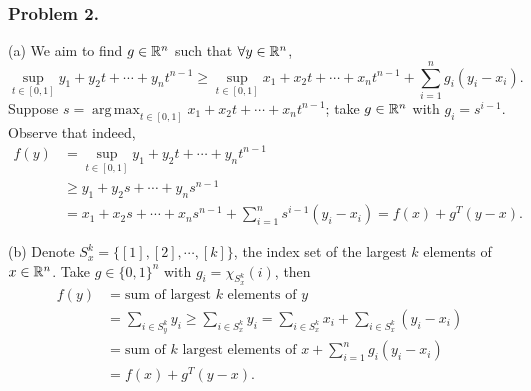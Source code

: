 \documentclass[12pt,a4paper]{article}
\newcommand{\SUM}[2]{\sum\limits_{#1}^{#2}}
\DeclareMathOperator*{\argmax}{arg\,max}
\def\R{\ifmmode\mathbb R\fi}
\newcommand{\nm}[1]{{n-{#1}}}
\begin{document}
\subsubsection*{Problem 2. }
(a) We aim to find $g\in\R^n$ such that $\forall y \in \R^n$,
$$ \sup_{t\in[0, 1]} y_1 + y_2t + \cdots + y_nt^\nm1 \geq \sup_{t\in[0, 1]} x_1 + x_2t + \cdots + x_nt^\nm1 + \SUM{i=1}{n} g_i(y_i - x_i).$$
Suppose $s = \argmax_{t\in[0, 1]} x_1 + x_2t + \cdots + x_nt^\nm1$; take $g\in\R^n$ with $g_i = s^{i-1}$. Observe that indeed,
\begin{align*}
  f(y) & = \sup_{t\in[0, 1]} y_1 + y_2t + \cdots + y_nt^\nm1 \\
       & \geq y_1 + y_2s + \cdots + y_ns^\nm1 \\
       & = x_1 + x_2s + \cdots + x_ns^\nm1 + \SUM{i=1}n s^{i-1}(y_i-x_i) = f(x) + g^T (y-x).
\end{align*}

\noindent(b) Denote $S_x^k = \{ [1], [2], \cdots, [k]\}$, the index set of the largest $k$ elements of $x\in\R^n$. Take $g\in\{0, 1\}^n$ with $g_i = \chi_{S_x^k}(i)$, then
\begin{align*}
  f(y) &= \mbox{sum of largest $k$ elements of $y$} \\
       &= \SUM{i\in S_y^k}{} y_i \geq \SUM{i\in S_x^k}{} y_i = \SUM{i\in S_x^k}{} x_i + \SUM{i\in S_x^k}{} (y_i - x_i) \\
       &= \mbox{sum of $k$ largest elements of $x$} + \SUM{i=1}n g_i(y_i - x_i) \\
       &= f(x) + g^T(y-x).
\end{align*}
\end{document}
